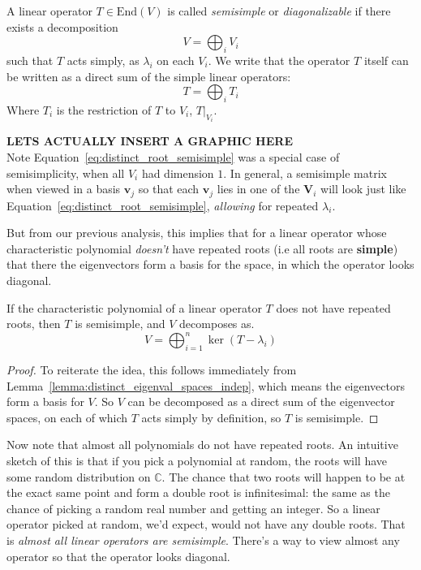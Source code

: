 	\begin{defn}[Semisimplicity]
		A linear operator $T \in \mathrm{End}(V)$ is called \emph{semisimple} or \emph{diagonalizable} if there exists a decomposition 
		\begin{equation}
			V = \bigoplus_i V_i
		\end{equation}
		such that $T$ acts simply, as $\lambda_i$ on each $V_i$. We write that the operator $T$ itself can be written as a direct sum of the simple linear operators:
		\begin{equation}
			T = \bigoplus_i T_i
		\end{equation}
		Where $T_i$ is the restriction of $T$ to $V_i$, $T|_{V_i}$.
	\end{defn}
	\textbf{LETS ACTUALLY INSERT A GRAPHIC HERE}\\
	Note Equation~\eqref{eq:distinct_root_semisimple} was a special case of semisimplicity, when all $V_i$ had dimension $1$. In general, a semisimple matrix when viewed in a basis $\mathbf v_j$ so that each $\mathbf v_j$ lies in one of the $\mathbf V_i$ will look just like Equation~\eqref{eq:distinct_root_semisimple}, \emph{allowing} for repeated $\lambda_i$.
	
	But from our previous analysis, this implies that for a linear operator whose characteristic polynomial \emph{doesn't} have repeated roots (i.e  all roots are \textbf{simple}) that there the eigenvectors form a basis for the space, in which the operator looks diagonal. 
	\begin{theorem}\label{thm:semisimple_lacking_repeated_eigs}
		If the characteristic polynomial of a linear operator $T$ does not have repeated roots, then $T$ is semisimple, and $V$ decomposes as.
		\begin{equation}
			V = \bigoplus_{i=1}^n \ker(T - \lambda_i)
		\end{equation}
	\end{theorem}
	\begin{proof}
		To reiterate the idea, this follows immediately from Lemma~\ref{lemma:distinct_eigenval_spaces_indep}, which means the eigenvectors form a basis for $V$. So $V$ can be decomposed as a direct sum of the eigenvector spaces, on each of which $T$ acts simply by definition, so $T$ is semisimple. 
	\end{proof}
	
	Now note that almost all polynomials do not have repeated roots. An intuitive sketch of this is that if you pick a polynomial at random, the roots will have some random distribution on $\mathbb{C}$. The chance that two roots will happen to be at the exact same point and form a double root is infinitesimal: the same as the chance of picking a random real number and getting an integer. So a linear operator picked at random, we'd expect, would not have any double roots. That is \emph{almost all linear operators are semisimple}. There's a way to view almost any operator so that the operator looks diagonal.
	

